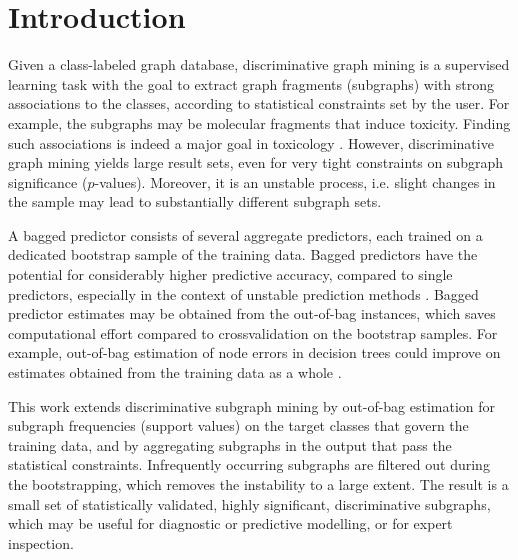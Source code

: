 \documentclass{article}
\begin{document}
\section{Introduction}
Given a class-labeled graph database, discriminative graph mining is a
supervised learning task with the goal to extract graph fragments (subgraphs)
with strong associations to the classes, according to statistical constraints
set by the user. For example, the subgraphs may be molecular fragments that
induce toxicity. Finding such associations is indeed a major goal in toxicology
\cite{kazius05derivation}. However, discriminative graph mining yields large
result sets, even for very tight constraints on subgraph significance ($p$-values). Moreover, it is an unstable
process, i.e. slight changes in the sample may lead to substantially different subgraph
sets. 

A bagged predictor consists of several aggregate predictors, each trained on a
dedicated bootstrap sample of the training data. Bagged predictors have the
potential for considerably higher predictive accuracy, compared to single
predictors, especially in the context of unstable prediction methods
\cite{breiman96oob}. Bagged predictor estimates may be obtained from the out-of-bag
instances, which saves computational effort compared to crossvalidation on the
bootstrap samples. For example, out-of-bag estimation of node errors in
decision trees could improve on estimates obtained from the training data as a
whole \cite{breiman96oob}.

This work extends discriminative subgraph mining by out-of-bag estimation for
subgraph frequencies (support values) on the target classes that govern the
training data, and by aggregating subgraphs in the output that pass the
statistical constraints.  Infrequently occurring subgraphs are filtered out
during the bootstrapping, which removes the instability to a large extent. The
result is a small set of statistically validated, highly significant,
discriminative subgraphs, which may be useful for diagnostic or predictive
modelling, or for expert inspection. 
\end{document}
